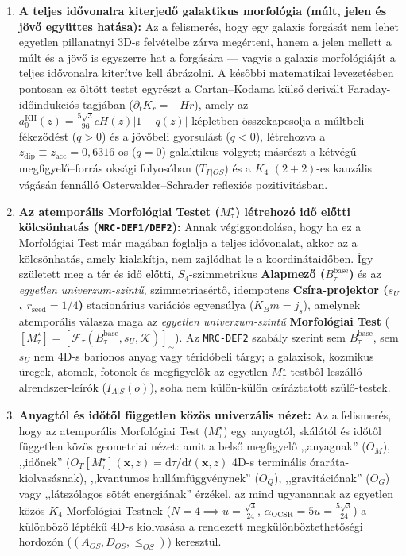 \documentclass[11pt,a4paper]{article}
\begin{document}
\begin{enumerate}[leftmargin=1.5em]
\item \textbf{A teljes id\H{o}vonalra kiterjed\H{o} galaktikus morfológia (múlt, jelen és jöv\H{o} együttes hatása):} Az a felismerés, hogy egy galaxis forgását nem lehet egyetlen pillanatnyi 3D-s felvételbe zárva megérteni, hanem a jelen mellett a múlt és a jöv\H{o} is egyszerre hat a forgására --- vagyis a galaxis morfológiáját a teljes id\H{o}vonalra kiterítve kell ábrázolni. A kés\H{o}bbi matematikai levezetésben pontosan ez öltött testet egyrészt a Cartan--Kodama küls\H{o} derivált Faraday-id\H{o}indukciós tagjában ($\partial_t K_r = -\dot{H}r$), amely az $a_0^{\mathrm{KH}}(z) = \frac{5\sqrt{3}}{96}cH(z)|1 - q(z)|$ képletben összekapcsolja a múltbeli fékez\H{o}dést ($q>0$) és a jöv\H{o}beli gyorsulást ($q<0$), létrehozva a $z_{\mathrm{dip}} \equiv z_{\mathrm{acc}} = 0{,}6316$-os ($q=0$) galaktikus völgyet; másrészt a kétvég\H{u} megfigyel\H{o}--forrás oksági folyosóban ($T_{P|OS}$) és a $K_4$ $(2+2)$-es kauzális vágásán fennálló Osterwalder--Schrader reflexiós pozitivitásban.
\item \textbf{Az atemporális Morfológiai Testet ($M_\tau^\star$) létrehozó id\H{o} el\H{o}tti kölcsönhatás (\texttt{MRC-DEF1/DEF2}):} Annak végiggondolása, hogy ha ez a Morfológiai Test már magában foglalja a teljes id\H{o}vonalat, akkor az a kölcsönhatás, amely kialakítja, nem zajlódhat le a koordinátaid\H{o}ben. Így született meg a tér és id\H{o} el\H{o}tti, $S_4$-szimmetrikus \textbf{Alapmez\H{o} ($B_\tau^{\mathrm{base}}$)} és az \emph{egyetlen univerzum-szint\H{u}}, szimmetriasért\H{o}, idempotens \textbf{Csíra-projektor ($s_U$, $r_{\mathrm{seed}} = 1/4$)} stacionárius variációs egyensúlya ($K_B m = j_s$), amelynek atemporális válasza maga az \emph{egyetlen univerzum-szint\H{u}} \textbf{Morfológiai Test} ($[M_\tau^\star] = [\mathcal{F}_\tau(B_\tau^{\mathrm{base}}, s_U, \mathcal{K})]_\sim$). Az \texttt{MRC-DEF2} szabály szerint sem $B_\tau^{\mathrm{base}}$, sem $s_U$ nem 4D-s barionos anyag vagy térid\H{o}beli tárgy; a galaxisok, kozmikus üregek, atomok, fotonok és megfigyel\H{o}k az egyetlen $M_\tau^\star$ testb\H{o}l leszálló alrendszer-leírók ($I_{A|S}(o)$), soha nem külön-külön csíráztatott szül\H{o}-testek.
\item \textbf{Anyagtól és id\H{o}t\H{o}l független közös univerzális nézet:} Az a felismerés, hogy az atemporális Morfológiai Test ($M_\tau^\star$) egy anyagtól, skálától és id\H{o}t\H{o}l független közös geometriai nézet: amit a bels\H{o} megfigyel\H{o} ,,anyagnak'' ($O_M$), ,,id\H{o}nek'' ($O_T[M_\tau^\star](\mathbf{x},z) = \mathrm{d}\tau/\mathrm{d}t(\mathbf{x},z)$ 4D-s terminális óraráta-kiolvasásnak), ,,kvantumos hullámfüggvénynek'' ($O_Q$), ,,gravitációnak'' ($O_G$) vagy ,,látszólagos sötét energiának'' érzékel, az mind ugyanannak az egyetlen közös $K_4$ Morfológiai Testnek ($N=4 \implies u = \frac{\sqrt{3}}{24}$, $\alpha_{\mathrm{OCSR}} = 5u = \frac{5\sqrt{3}}{24}$) a különböz\H{o} lépték\H{u} 4D-s kiolvasása a rendezett megkülönböztethet\H{o}ségi hordozón ($(A_{OS}, D_{OS}, \le_{OS})$) keresztül.
\end{enumerate}
\end{document}
